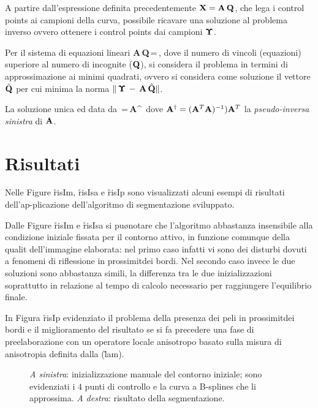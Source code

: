A partire dall'espressione definita precedentemente ${\bf X}={\bf A}\,{\bf Q}$, che lega i
control points ai campioni della curva, \e possibile ricavare una soluzione al problema
inverso ovvero ottenere i control points dai campioni ${\bf \Upsilon}$.

Per il sistema di equazioni lineari
\be
{\bf A}\,{\bf Q}\,=\,{\bf \Upsilon},
\ee
dove il numero di vincoli (equazioni) \e superiore al numero di incognite (${\bf Q}$), 
si considera il problema in termini di approssimazione ai minimi quadrati,
ovvero si considera come soluzione il vettore $\hat{\bf Q}$ per cui \e minima la norma 
$\|\,{\bf \Upsilon}\,-\,{\bf A}\,\hat{\bf Q}\|$.

La soluzione \e unica ed \e data da
\be
{}\,=\,{\bf A}^{\dagger}\,{\bf \Upsilon} 
\ee
dove ${\bf A}^{\dagger}=({\bf A}^{T}{\bf A})^{-1}){\bf A}^{T}$ \e la
{\it pseudo-inversa sinistra} di ${\bf A}$.
 
\section{Risultati}

Nelle Figure \r{risIm}, \r{risIsa} e \r{risIp} sono visualizzati alcuni esempi di risultati
dell'ap-plicazione dell'algoritmo di segmentazione sviluppato.

Dalle Figure \r{risIm} e \r{risIsa} si pu\o notare che l'algoritmo \e abbastanza insensibile
alla condizione iniziale fissata per il contorno attivo, in funzione comunque della qualit\a
dell'immagine elaborata: nel primo caso infatti vi sono dei disturbi dovuti a fenomeni di
riflessione in prossimit\a dei bordi.
Nel secondo caso invece le due soluzioni sono abbastanza simili, la differenza tra le due
inizializzazioni \e soprattutto in relazione al tempo di calcolo necessario per raggiungere 
l'equilibrio finale.

In Figura \r{risIp} \e evidenziato il problema della presenza dei peli in prossimit\a dei
bordi e il miglioramento del risultato se si fa precedere una fase di preelaborazione con
un operatore locale anisotropo basato sulla misura di anisotropia definita dalla (\r{lam}).

\finepar

\begin{figure}[tbp]
 \centerline{
   \hfill
  }
 \centerline{
   \hfill
  }
   \caption[Risultato della segmentazione con inizializzazione manuale]
    {{\sl A sinistra}: inizializzazione manuale del contorno iniziale; sono evidenziati i $4$
     punti di controllo e la curva a B-splines che li approssima. {\sl A destra}: risultato 
     della segmentazione.}
\end{figure}


